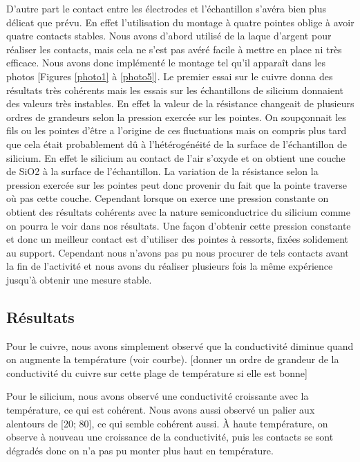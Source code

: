 D'autre part le contact entre les électrodes et l'échantillon s'avéra bien plus délicat que prévu. 
En effet l'utilisation du montage à quatre pointes oblige à avoir quatre contacts stables.
Nous avons d'abord utilisé de la laque d'argent pour réaliser les contacts, mais cela ne s'est pas avéré facile à mettre en place ni très efficace.
Nous avons donc implémenté le montage tel qu'il apparaît dans les photos [Figures \ref{photo1} à \ref{photo5}]. Le premier essai sur le cuivre donna des résultats 
très cohérents mais les essais sur les échantillons de silicium donnaient des valeurs très instables. 
En effet la valeur de la résistance changeait de plusieurs ordres de grandeurs selon la pression exercée sur les 
pointes. On soupçonnait les fils ou les pointes d'être a l'origine de ces fluctuations 
mais on compris plus tard que cela était probablement dû à l'hétérogénéité de la surface de l'échantillon de silicium. 
En effet le silicium au contact de l'air s'oxyde et on obtient une couche de SiO2 à la surface de l'échantillon. 
La variation de la résistance selon la pression exercée sur les pointes peut donc provenir du fait que la pointe 
traverse où pas cette couche. Cependant lorsque on exerce une pression constante on obtient des résultats cohérents avec la nature semiconductrice du silicium comme on pourra le voir dans nos résultats. Une façon d'obtenir cette pression constante et donc un meilleur contact est d'utiliser des pointes à ressorts, fixées solidement au support. Cependant nous n'avons pas pu nous procurer de tels contacts avant la fin de l'activité et nous avons du réaliser plusieurs fois la même expérience jusqu'à obtenir une mesure stable.


\subsection{Résultats}
Pour le cuivre, nous avons simplement observé que la conductivité diminue quand on augmente la température (voir courbe).
[donner un ordre de grandeur de la conductivité du cuivre sur cette plage de température si elle est bonne]


Pour le silicium, nous avons observé une conductivité croissante avec la température, ce qui est cohérent. Nous avons aussi observé un palier aux alentours de [20\celsius{}; 80\celsius{}], ce qui semble cohérent aussi.
À haute température, on observe à nouveau une croissance de la conductivité, 
puis les contacts se sont dégradés donc on n'a pas pu monter plus haut en température.


